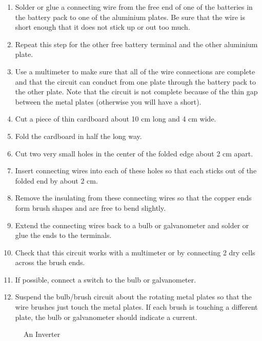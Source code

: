 \begin{enumerate}
\item{Solder or glue a connecting wire from the free end of one of the batteries in the battery pack to one of the aluminium plates. Be sure that the wire is short enough that it does not stick up or out too much.} 
\item{Repeat this step for the other free battery terminal and the other aluminium plate.} 
\item{Use a multimeter to make sure that all of the wire connections are complete and that the circuit can conduct from one plate through the battery pack to the other plate. Note that the circuit is not complete because of the thin gap between the metal plates (otherwise you will have a short).} 
\item{Cut a piece of thin cardboard about 10 cm long and 4 cm wide.} 
\item{Fold the cardboard in half the long way.} 
\item{Cut two very small holes in the center of the folded edge about 2 cm apart.} 
\item{Insert connecting wires into each of these holes so that each sticks out of the folded end by about 2 cm.} 
\item{Remove the insulating from these connecting wires so that the copper ends form brush shapes and are free to bend slightly.} 
\item{Extend the connecting wires back to a bulb or galvanometer and solder or glue the ends to the terminals.} 
\item{Check that this circuit works with a multimeter or by connecting 2 dry cells across the brush ends.} 
\item{If possible, connect a switch to the bulb or galvanometer.} 
\item{Suspend the bulb/brush circuit about the rotating metal plates so that the wire brushes just touch the metal plates. If each brush is touching a different plate, the bulb or galvanometer should indicate a current.} 
\end{enumerate}

\begin{figure}
\begin{center}
\def\svgwidth{250pt}

\caption{An Inverter}
\label{fig:inverter}
\end{center}
\end{figure}


